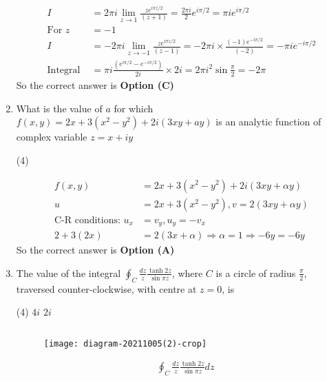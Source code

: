 \begin{enumerate}[label=\color{ocre}\textbf{\arabic*.}]
\begin{answer}
\begin{align*}
		I&=2 \pi i \lim _{z \rightarrow 1} \frac{z e^{i \pi z / 2}}{(z+1)}=\frac{2 \pi i}{2} e^{i \pi / 2}=\pi i e^{i \pi / 2}\\
		\text{For }z&=-1\\
		I&=-2 \pi i \lim _{z \rightarrow-1} \frac{z e^{i \pi z / 2}}{(z-1)}=-2 \pi i \times \frac{(-1) e^{-i \pi / 2}}{(-2)}=-\pi i e^{-i \pi / 2}\\
		\text{Integral }&=\pi i \frac{\left(e^{i \pi / 2}-e^{-i \pi / 2}\right)}{2 i} \times 2 i=2 \pi i^{2} \sin \frac{\pi}{2}=-2 \pi
		\end{align*}
		So the correct answer is \textbf{Option (C)}
	\end{answer}
	\item What is the value of $a$ for which $f(x, y)=2 x+3\left(x^{2}-y^{2}\right)+2 i(3 x y+a y)$ is an analytic function of complex variable $z=x+i y$
	{}
	\begin{tasks}(4)
	\end{tasks}
	\begin{answer}
		\begin{align*}
		f(x, y)&=2 x+3\left(x^{2}-y^{2}\right)+2 i(3 x y+\alpha y)\\
		u&=2 x+3\left(x^{2}-y^{2}\right), v=2(3 x y+\alpha y)\\
		\text{C-R conditions: }u_{x}&=v_{y}, u_{y}=-v_{x}\\
		2+3(2 x)&=2(3 x+\alpha) \Rightarrow \alpha=1 \Rightarrow-6 y=-6 y
		\end{align*}
		So the correct answer is \textbf{Option (A)}
	\end{answer}
	\item  The value of the integral $\oint_{C} \frac{d z}{z} \frac{\tanh 2 z}{\sin \pi z}$, where $C$ is a circle of radius $\frac{\pi}{2}$, traversed counter-clockwise, with centre at $z=0$, is
	{}
	\begin{tasks}(4)
		\task[\textbf{B.}] $4 i$
		\task[\textbf{C.}] $2 i$
	\end{tasks}
	\begin{answer}$\left. \right. $
		\begin{figure}[H]
			\centering
			\texttt{[image: diagram-20211005(2)-crop]}
		\end{figure}
		\begin{align*}
		&\oint_{C} \frac{d z}{z} \frac{\tanh 2 z}{\sin \pi z} d z\\

\end{align*}
\end{answer}
\end{enumerate}
